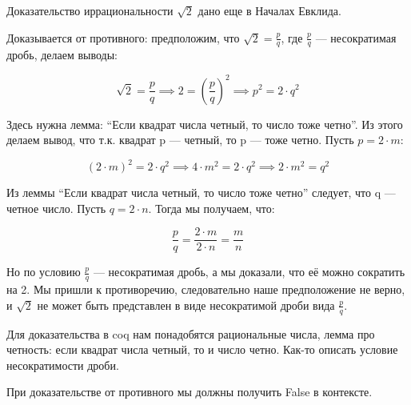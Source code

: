 \documentclass[12pt]{article}
\begin{document}
Доказательство иррациональности $\sqrt{2}$ дано еще в Началах Евклида.

Доказывается от противного: предположим, что $\sqrt{2} = \frac{p}{q}$, где $\frac{p}{q}$ --- несократимая дробь, делаем выводы:

$$
\sqrt{2} = \frac{p}{q} \implies 2 = \left(\frac{p}{q}\right)^2 \implies p^2 = 2 \cdot q^2
$$

Здесь нужна лемма: ``Если квадрат числа четный, то число тоже четно''. Из этого делаем вывод, что т.к. квадрат p --- четный, то p --- тоже четно. Пусть $p = 2 \cdot m$:

$$
(2 \cdot m)^2 = 2 \cdot q^2 \implies 4 \cdot m^2 = 2 \cdot q^2 \implies 2 \cdot m^2 = q^2
$$

Из леммы ``Если квадрат числа четный, то число тоже четно'' следует, что q --- четное число. Пусть $q = 2 \cdot n$. Тогда мы получаем, что:

$$
\frac{p}{q} = \frac{2 \cdot m}{2 \cdot n} = \frac{m}{n}
$$

Но по условию $\frac{p}{q}$ --- несократимая дробь, а мы доказали, что её можно сократить на 2. Мы пришли к противоречию, следовательно наше предположение не верно, и $\sqrt{2}$ не может быть представлен в виде несократимой дроби вида $\frac{p}{q}$.

Для доказательства в coq нам понадобятся рациональные числа, лемма про четность: если квадрат числа четный, то и число четно. Как-то описать условие несократимости дроби.

При доказательстве от противного мы должны получить False в контексте.
\end{document}
